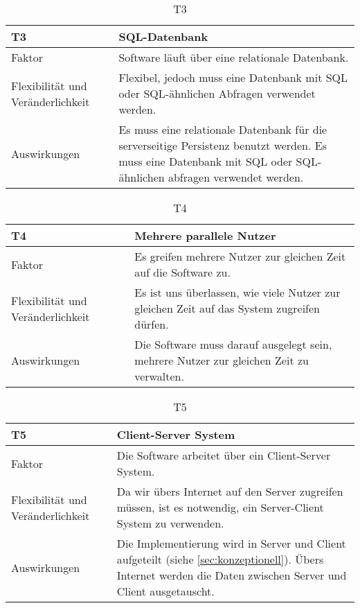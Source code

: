 \begin{table}[H]
\caption{T3}
\begin{tabular}{|p{3cm}|p{12cm}|}\hline
\textbf{T3} & \textbf{SQL-Datenbank} \\ \hline \hline
Faktor & Software läuft über eine relationale Datenbank.\\ \hline
Flexibilität und Veränderlichkeit & Flexibel, jedoch muss eine Datenbank mit SQL oder SQL-ähnlichen Abfragen verwendet werden.  \\ \hline
Auswirkungen & Es muss eine relationale Datenbank für die serverseitige Persistenz benutzt werden. Es muss eine Datenbank mit SQL oder SQL-ähnlichen abfragen verwendet werden.\\ \hline
\end{tabular}
\end{table}

\begin{table}[H]
\caption{T4}
\begin{tabular}{|p{3cm}|p{12cm}|}\hline
\textbf{T4} & \textbf{Mehrere parallele Nutzer} \\ \hline \hline
Faktor & Es greifen mehrere Nutzer zur gleichen Zeit auf die Software zu.\\ \hline
Flexibilität und Veränderlichkeit & Es ist uns überlassen, wie viele Nutzer zur gleichen Zeit auf das System zugreifen dürfen.  \\ \hline
Auswirkungen & Die Software muss darauf ausgelegt sein, mehrere Nutzer zur gleichen Zeit zu verwalten.\\ \hline
\end{tabular}
\end{table}

\begin{table}[H]
\caption{T5}
\begin{tabular}{|p{3cm}|p{12cm}|}\hline
\textbf{T5} & \textbf{Client-Server System} \\ \hline \hline
Faktor & Die Software arbeitet über ein Client-Server System.\\ \hline
Flexibilität und Veränderlichkeit & Da wir übers Internet auf den Server zugreifen müssen, ist es notwendig, ein Server-Client System zu verwenden. \\ \hline
Auswirkungen & Die Implementierung wird in Server und Client aufgeteilt (siehe \ref{sec:konzeptionell}). Übers Internet werden die Daten zwischen Server und Client ausgetauscht.\\ \hline
\end{tabular}
\end{table}

